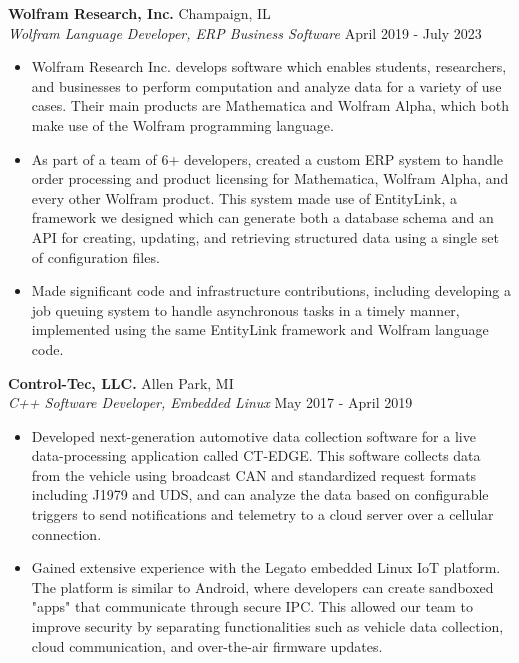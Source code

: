 \documentclass[margin,11pt]{res}
\begin{document}
\begin{resume}
\textbf{Wolfram Research, Inc.} \hfill Champaign, IL\\
\textsl{Wolfram Language Developer, ERP Business Software} \hfill April 2019 - July 2023
\begin{itemize}
    \itemsep -2pt
    \item Wolfram Research Inc. develops software which enables students,
          researchers, and businesses to perform computation and analyze data
          for a variety of use cases. Their main products are Mathematica and
          Wolfram Alpha, which both make use of the Wolfram programming language.
    \item As part of a team of 6+ developers, created a custom ERP system to
          handle order processing and product licensing for Mathematica, Wolfram
          Alpha, and every other Wolfram product. This system made use of
          EntityLink, a framework we designed which can generate both a database
          schema and an API for creating, updating, and retrieving structured
          data using a single set of configuration files.
    \item Made significant code and infrastructure contributions, including
          developing a job queuing system to handle asynchronous tasks in a
          timely manner, implemented using the same EntityLink framework and
          Wolfram language code.
\end{itemize}

\vspace{-10pt}
\textbf{Control-Tec, LLC.} \hfill Allen Park, MI\\
\textsl{C++ Software Developer, Embedded Linux} \hfill May 2017 - April 2019
\begin{itemize}
    \itemsep -2pt
    \item Developed next-generation automotive data collection software for a
          live data-processing application called CT-EDGE. This software
          collects data from the vehicle using broadcast CAN and standardized
          request formats including J1979 and UDS, and can analyze the data
          based on configurable triggers to send notifications and telemetry
          to a cloud server over a cellular connection.
    \item Gained extensive experience with the Legato embedded Linux IoT
          platform. The platform is similar to Android, where developers
          can create sandboxed "apps" that communicate through secure IPC.
          This allowed our team to improve security by separating
          functionalities such as vehicle data collection, cloud communication,
          and over-the-air firmware updates.
\end{itemize}


\end{resume}
\end{document}

